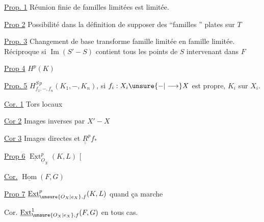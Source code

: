 \uline{Prop. 1} Réunion finie de familles limitées est limitée.

\uline{Prop 2} Possibilité dans la définition de supposer  des  ``familles '' plates sur $T$

\uline{Prop. 3} Changement de base  transforme famille limitée en famille limitée. Réciproque si $\operatorname{Im}(S'-S)$ contient tous les points de $S$ intervenant dans $F$

\uline{Prop 4} $H^p(K)$

\uline{Prop. 5} $H^{S\,p}_{f_1,-,f_n}(K_1,-,K_n)$, si $f_i:X_i\unsure{-|\longrightarrow}X$ est propre, $K_i$ sur $X_i$.

\uline{Cor. 1}  Tors locaux 

\uline{Cor 2} Images inverses par $X'-X$

\uline{Cor 3} Images directes et $\underline{\underline R}^p f_*$


\uline{Prop 6} $\underline{\operatorname{Ext}}^p_{\underline O_X}(K,L)$ \hfill $[$

\uline{Cor.} $\underline{\operatorname{Hom}}(F,G)$

\uline{Prop 7} $\underline{\operatorname{Ext}}^p_{\unsure{O_X|e_X},f}(K,L)$ quand ça marche

Cor. $\underline{\operatorname{Ext}}^1_{\unsure{O_X|e_X},f}(F,G)$ en tous cas.
